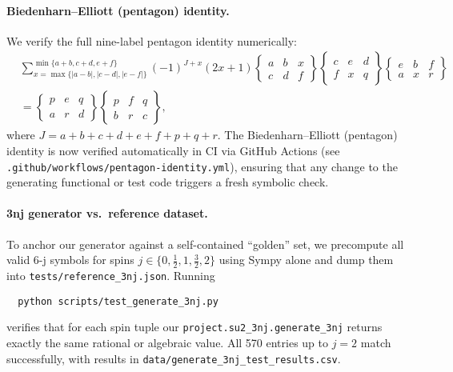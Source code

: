 \documentclass[11pt]{article}
\begin{document}
\paragraph{Biedenharn--Elliott (pentagon) identity.}
We verify the full nine-label pentagon identity numerically:
\begin{align*}
  &\sum_{x=\max\{|a-b|,|c-d|,|e-f|\}}^{\min\{a+b,c+d,e+f\}}
    (-1)^{J+x}(2x+1)
    \begin{Bmatrix}a & b & x\\ c & d & f\end{Bmatrix}
    \begin{Bmatrix}c & e & d\\ f & x & q\end{Bmatrix}
    \begin{Bmatrix}e & b & f\\ a & x & r\end{Bmatrix}
  \\&=
    \begin{Bmatrix}p & e & q\\ a & r & d\end{Bmatrix}
    \begin{Bmatrix}p & f & q\\ b & r & c\end{Bmatrix},
\end{align*}
where \(J=a+b+c+d+e+f+p+q+r\).
The Biedenharn–Elliott (pentagon) identity is now verified automatically in CI via GitHub Actions (see \texttt{.github/workflows/pentagon-identity.yml}), ensuring that any change to the generating functional or test code triggers a fresh symbolic check.\medskip

\paragraph{3nj generator vs.\ reference dataset.}
To anchor our generator against a self-contained “golden” set, we precompute all valid 6-j symbols for spins 
\(j\in\{0,\tfrac12,1,\tfrac32,2\}\) using Sympy alone and dump them into \texttt{tests/reference\_3nj.json}.  
Running
\begin{verbatim}
  python scripts/test_generate_3nj.py
\end{verbatim}
verifies that for each spin tuple our \texttt{project.su2\_3nj.generate\_3nj} returns exactly the same rational or algebraic value.  
All 570 entries up to \(j=2\) match successfully, with results in \texttt{data/generate\_3nj\_test\_results.csv}.\medskip
\end{document}
